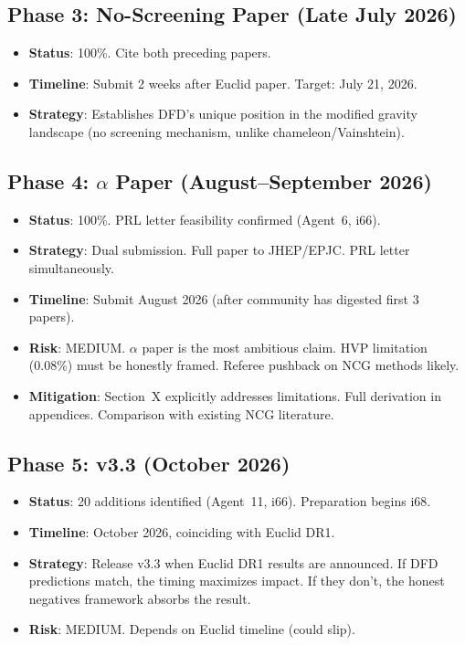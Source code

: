 \documentclass[11pt,a4paper]{article}
\begin{document}
\subsection{Phase 3: No-Screening Paper (Late July 2026)}

\begin{itemize}
\item \textbf{Status}: 100\%. Cite both preceding papers.
\item \textbf{Timeline}: Submit 2 weeks after Euclid paper. Target: July 21, 2026.
\item \textbf{Strategy}: Establishes DFD's unique position in the modified gravity landscape (no screening mechanism, unlike chameleon/Vainshtein).
\end{itemize}

\subsection{Phase 4: $\alpha$ Paper (August--September 2026)}

\begin{itemize}
\item \textbf{Status}: 100\%. PRL letter feasibility confirmed (Agent~6, i66).
\item \textbf{Strategy}: Dual submission. Full paper to JHEP/EPJC. PRL letter simultaneously.
\item \textbf{Timeline}: Submit August 2026 (after community has digested first 3 papers).
\item \textbf{Risk}: MEDIUM. $\alpha$ paper is the most ambitious claim. HVP limitation (0.08\%) must be honestly framed. Referee pushback on NCG methods likely.
\item \textbf{Mitigation}: Section~X explicitly addresses limitations. Full derivation in appendices. Comparison with existing NCG literature.
\end{itemize}

\subsection{Phase 5: v3.3 (October 2026)}

\begin{itemize}
\item \textbf{Status}: 20 additions identified (Agent~11, i66). Preparation begins i68.
\item \textbf{Timeline}: October 2026, coinciding with Euclid DR1.
\item \textbf{Strategy}: Release v3.3 when Euclid DR1 results are announced. If DFD predictions match, the timing maximizes impact. If they don't, the honest negatives framework absorbs the result.
\item \textbf{Risk}: MEDIUM. Depends on Euclid timeline (could slip).
\end{itemize}
\end{document}
